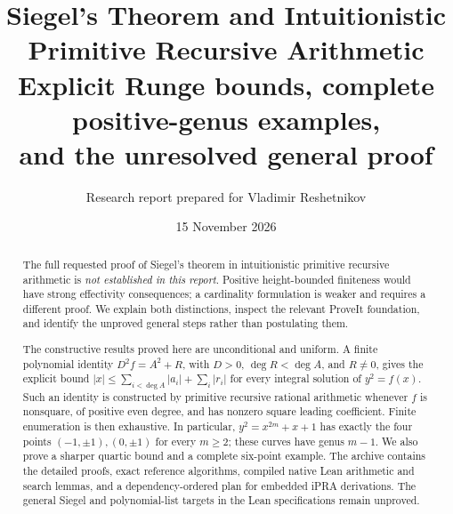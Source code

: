 \documentclass[11pt,letterpaper]{article}
\title{Siegel's Theorem and Intuitionistic Primitive Recursive Arithmetic\\[0.6em]
\large Explicit Runge bounds, complete positive-genus examples,\\
and the unresolved general proof}
\author{Research report prepared for Vladimir Reshetnikov}
\date{15 November 2026}
\theoremstyle{definition}
\begin{document}
\maketitle
\begin{abstract}
The full requested proof of Siegel's theorem in intuitionistic primitive
recursive arithmetic is \emph{not established in this report}. Positive
height-bounded finiteness would have strong effectivity consequences; a
cardinality formulation is weaker and requires a different proof. We explain
both distinctions, inspect the relevant ProveIt foundation, and identify the
unproved general steps rather than postulating them.

The constructive results proved here are unconditional and uniform. A finite
polynomial identity $D^2f=A^2+R$, with $D>0$, $\deg R<\deg A$, and $R\ne0$,
gives the explicit bound
$|x|\le\sum_{i<\deg A}|a_i|+\sum_i|r_i|$ for every integral solution of
$y^2=f(x)$. Such an identity is constructed by primitive recursive rational
arithmetic whenever $f$ is nonsquare, of positive even degree, and has nonzero
square leading coefficient. Finite enumeration is then exhaustive. In
particular, $y^2=x^{2m}+x+1$ has exactly the four points
$(-1,\pm1),(0,\pm1)$ for every $m\ge2$; these curves have genus $m-1$.
We also prove a sharper quartic bound and a complete six-point example.
The archive contains the detailed proofs, exact reference algorithms,
compiled native Lean arithmetic and search lemmas, and a dependency-ordered
plan for embedded iPRA derivations. The general Siegel and polynomial-list
targets in the Lean specifications remain unproved.
\end{abstract}
\tableofcontents
\newpage








\end{document}

